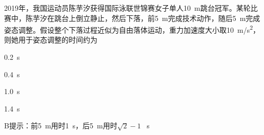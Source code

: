 2019年，我国运动员陈芋汐获得国际泳联世锦赛女子单人\qty{10}{m}跳台冠军。某轮比赛中，陈芋汐在跳台上倒立静止，然后下落，前\qty{5}{m}完成技术动作，随后\qty{5}{m}完成姿态调整。假设整个下落过程近似为自由落体运动，重力加速度大小取\qty{10}{m/s^2}，则她用于姿态调整的时间约为\paren[B]
\begin{choices}
	\item \qty{0.2}{s}
	\item \qty{0.4}{s}
	\item \qty{1.0}{s}
	\item \qty{1.4}{s}
\end{choices}
\begin{answer}
	B\qquad 提示：前\qty{5}{m}用时\qty{1}{s}，后\qty{5}{m}用时\(\sqrt{2} - 1\) \qty{}{s}
\end{answer}